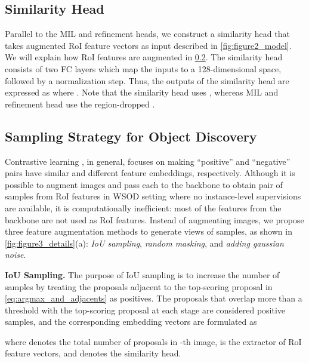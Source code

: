 \documentclass[runningheads]{llncs}
\begin{document}
\subsection{Similarity Head}
Parallel to the MIL and refinement heads, we construct a similarity head  that takes augmented RoI feature vectors as input described in \cref{fig:figure2_model}.
We will explain how RoI features are augmented in \cref{sec:sampling_strategy}.
The similarity head consists of two FC layers which map the inputs to a 128-dimensional space, followed by a normalization step.
Thus, the outputs of the similarity head are expressed as  where .
Note that the similarity head uses , whereas MIL and refinement head use the region-dropped .

\subsection{Sampling Strategy for Object Discovery}
\label{sec:sampling_strategy}


Contrastive learning \cite{khosla2020supervised,chen2020simple}, in general, focuses on making ``positive'' and ``negative'' pairs have similar and different feature embeddings, respectively.
Although it is possible to augment images and pass each to the backbone to obtain pair of samples from RoI features in WSOD setting where no instance-level supervisions are available, it is computationally inefficient: most of the features from the backbone are not used as RoI features. 
Instead of augmenting images, we propose three feature augmentation methods to generate views of samples, as shown in
\cref{fig:figure3_details}(a):
\textit{IoU sampling}, \textit{random masking}, and \textit{adding gaussian noise}.
















\noindent\textbf{IoU Sampling.}
The purpose of IoU sampling is to increase the number of samples by treating the proposals adjacent to the top-scoring proposal  in \eqref{eq:argmax_and_adjacents} as positives. The proposals that overlap more than a threshold  with the top-scoring proposal at each stage  are considered positive samples, and the corresponding embedding vectors are formulated as

where  denotes the total number of proposals in -th image,  is the extractor of RoI feature vectors, and  denotes the similarity head.
\end{document}
